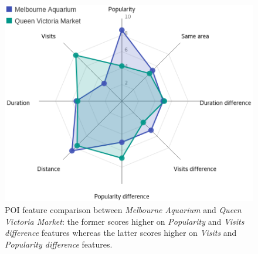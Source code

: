 \begin{figure}[t!]
\includegraphics[width=0.6\linewidth]{figure/sample_radar.png} \vspace{-10pt}
    \caption{POI feature comparison between \textit{Melbourne Aquarium} and \textit{Queen Victoria Market}: the former scores higher on \textit{Popularity} and \textit{Visits difference} features whereas the latter scores higher on \textit{Visits} and \textit{Popularity difference} features.}
\label{fig:radar} \vspace{-1em}
\end{figure}
